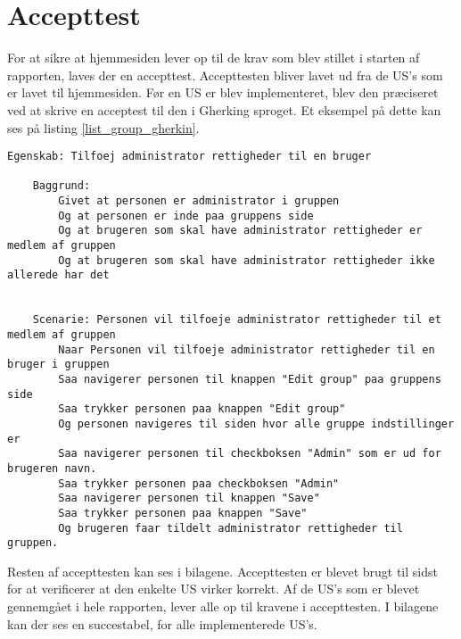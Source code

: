 \section{Accepttest}
For at sikre at hjemmesiden lever op til de krav som blev stillet i starten af rapporten, laves der en accepttest. Accepttesten bliver lavet ud fra de US's som er lavet til hjemmesiden. Før en US er blev implementeret, blev den præciseret ved at skrive en acceptest til den i Gherking sproget. Et eksempel på dette kan ses på listing \ref{list_group_gherkin}.
\\
\begin{lstlisting}[caption=Acceptest af US "Tilføj administrator rettigheder" i Gherkin sproget,label=list_group_gherkin,language=Gherkin]
Egenskab: Tilfoej administrator rettigheder til en bruger

    Baggrund:
        Givet at personen er administrator i gruppen
        Og at personen er inde paa gruppens side
        Og at brugeren som skal have administrator rettigheder er medlem af gruppen
        Og at brugeren som skal have administrator rettigheder ikke allerede har det
        
        
    Scenarie: Personen vil tilfoeje administrator rettigheder til et medlem af gruppen
        Naar Personen vil tilfoeje administrator rettigheder til en bruger i gruppen
        Saa navigerer personen til knappen "Edit group" paa gruppens side
        Saa trykker personen paa knappen "Edit group"
        Og personen navigeres til siden hvor alle gruppe indstillinger er
        Saa navigerer personen til checkboksen "Admin" som er ud for brugeren navn.
        Saa trykker personen paa checkboksen "Admin"
        Saa navigerer personen til knappen "Save"
        Saa trykker personen paa knappen "Save"
        Og brugeren faar tildelt administrator rettigheder til gruppen.
\end{lstlisting}

Resten af accepttesten kan ses i bilagene. Accepttesten er blevet brugt til sidst for at verificerer at den enkelte US virker korrekt. Af de US's som er blevet gennemgået i hele rapporten, lever alle op til kravene i accepttesten. I bilagene kan der ses en succestabel, for alle implementerede US's.